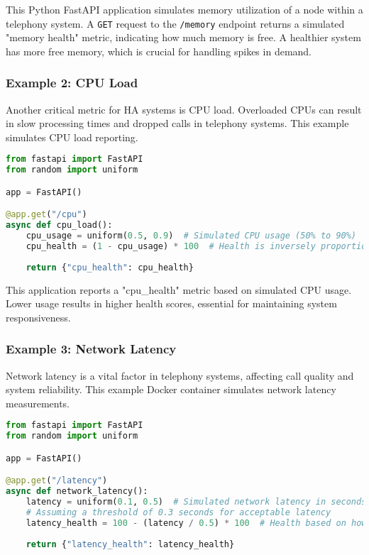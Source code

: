 \documentclass[12pt]{article}
\begin{document}
This Python FastAPI application simulates memory utilization of a node within a telephony system. A \texttt{GET} request to the \texttt{/memory} endpoint returns a simulated "memory health" metric, indicating how much memory is free. A healthier system has more free memory, which is crucial for handling spikes in demand.

\subsubsection{Example 2: CPU Load}

Another critical metric for HA systems is CPU load. Overloaded CPUs can result in slow processing times and dropped calls in telephony systems. This example simulates CPU load reporting.

\begin{lstlisting}[language=Python, caption=CPU Load FastAPI Application]
from fastapi import FastAPI
from random import uniform

app = FastAPI()

@app.get("/cpu")
async def cpu_load():
    cpu_usage = uniform(0.5, 0.9)  # Simulated CPU usage (50% to 90%)
    cpu_health = (1 - cpu_usage) * 100  # Health is inversely proportional to CPU usage
    
    return {"cpu_health": cpu_health}
\end{lstlisting}

This application reports a "cpu\_health" metric based on simulated CPU usage. Lower usage results in higher health scores, essential for maintaining system responsiveness.

\subsubsection{Example 3: Network Latency}

Network latency is a vital factor in telephony systems, affecting call quality and system reliability. This example Docker container simulates network latency measurements.

\begin{lstlisting}[language=Python, caption=Network Latency FastAPI Application]
from fastapi import FastAPI
from random import uniform

app = FastAPI()

@app.get("/latency")
async def network_latency():
    latency = uniform(0.1, 0.5)  # Simulated network latency in seconds
    # Assuming a threshold of 0.3 seconds for acceptable latency
    latency_health = 100 - (latency / 0.5) * 100  # Health based on how close to threshold
    
    return {"latency_health": latency_health}
\end{lstlisting}
\end{document}
